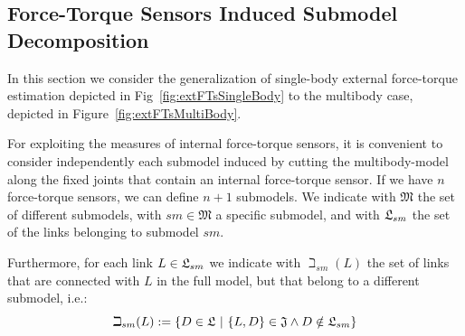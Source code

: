 \subsection{Force-Torque Sensors Induced Submodel Decomposition}
\label{subsec:modelDecomposition}
In this section we consider the generalization of single-body external force-torque estimation depicted in Fig~\ref{fig:extFTsSingleBody} to the multibody case, depicted in Figure~\ref{fig:extFTsMultiBody}.

For exploiting the measures of internal force-torque sensors, it is convenient to consider independently each submodel induced by cutting the multibody-model along the fixed joints that contain an internal force-torque sensor. If we have $n$ force-torque sensors, we can define $n+1$ submodels. We indicate with $\mathfrak{M}$ the set of different submodels, with $sm \in \mathfrak{M}$ a specific submodel, and with $\mathfrak{L}_{sm}$ the set of the links belonging to submodel $sm$. 

Furthermore, for each link $L \in \mathfrak{L}_{sm}$ we indicate with $\beth_{sm}(L)$ the set of links that are connected with $L$ in the full model, but that belong to a different submodel, i.e.: 
\begin{equation}
\beth_{sm}{(L)} := \{ D \in \mathfrak{L} \  | \  \{L,D\} \in \mathfrak{J} \land D \notin  \mathfrak{L}_{sm}\} 
\end{equation}


